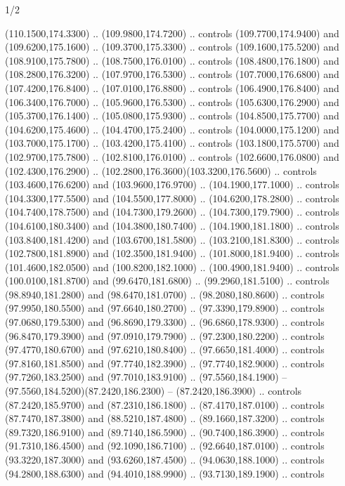 \begin{flagdescription}{1/2}
\begin{scope}[xshift=\flaglength/6]
\begin{scope}[scale=0.00247\flagwidth,yshift=241mm,xshift=-27.1mm]
\begin{scope}[y=0.80pt, x=0.80pt, yscale=-0.9, xscale=1]
\begin{scope}[cm={{-1.0,0.0,0.0,1.0,(-107.89793,0.0)}},shift={(-300.0,0)}]
\begin{scope}[shift={(-53.94897,373.26853)},draw=red]
  (110.1500,174.3300) .. (109.9800,174.7200) .. controls (109.7700,174.9400) and
  (109.6200,175.1600) .. (109.3700,175.3300) .. controls (109.1600,175.5200) and
  (108.9100,175.7800) .. (108.7500,176.0100) .. controls (108.4800,176.1800) and
  (108.2800,176.3200) .. (107.9700,176.5300) .. controls (107.7000,176.6800) and
  (107.4200,176.8400) .. (107.0100,176.8800) .. controls (106.4900,176.8400) and
  (106.3400,176.7000) .. (105.9600,176.5300) .. controls (105.6300,176.2900) and
  (105.3700,176.1400) .. (105.0800,175.9300) .. controls (104.8500,175.7700) and
  (104.6200,175.4600) .. (104.4700,175.2400) .. controls (104.0000,175.1200) and
  (103.7000,175.1700) .. (103.4200,175.4100) .. controls (103.1800,175.5700) and
  (102.9700,175.7800) .. (102.8100,176.0100) .. controls (102.6600,176.0800) and
  (102.4300,176.2900) .. (102.2800,176.3600)(103.3200,176.5600) .. controls
  (103.4600,176.6200) and (103.9600,176.9700) .. (104.1900,177.1000) .. controls
  (104.3300,177.5500) and (104.5500,177.8000) .. (104.6200,178.2800) .. controls
  (104.7400,178.7500) and (104.7300,179.2600) .. (104.7300,179.7900) .. controls
  (104.6100,180.3400) and (104.3800,180.7400) .. (104.1900,181.1800) .. controls
  (103.8400,181.4200) and (103.6700,181.5800) .. (103.2100,181.8300) .. controls
  (102.7800,181.8900) and (102.3500,181.9400) .. (101.8000,181.9400) .. controls
  (101.4600,182.0500) and (100.8200,182.1000) .. (100.4900,181.9400) .. controls
  (100.0100,181.8700) and (99.6470,181.6800) .. (99.2960,181.5100) .. controls
  (98.8940,181.2800) and (98.6470,181.0700) .. (98.2080,180.8600) .. controls
  (97.9950,180.5500) and (97.6640,180.2700) .. (97.3390,179.8900) .. controls
  (97.0680,179.5300) and (96.8690,179.3300) .. (96.6860,178.9300) .. controls
  (96.8470,179.3900) and (97.0910,179.7900) .. (97.2300,180.2200) .. controls
  (97.4770,180.6700) and (97.6210,180.8400) .. (97.6650,181.4000) .. controls
  (97.8160,181.8500) and (97.7740,182.3900) .. (97.7740,182.9000) .. controls
  (97.7260,183.2500) and (97.7010,183.9100) .. (97.5560,184.1900) --
  (97.5560,184.5200)(87.2420,186.2300) -- (87.2420,186.3900) .. controls
  (87.2420,185.9700) and (87.2310,186.1800) .. (87.4170,187.0100) .. controls
  (87.7470,187.3800) and (88.5210,187.4800) .. (89.1660,187.3200) .. controls
  (89.7320,186.9100) and (89.7140,186.5900) .. (90.7400,186.3900) .. controls
  (91.7310,186.4500) and (92.1090,186.7100) .. (92.6640,187.0100) .. controls
  (93.3220,187.3000) and (93.6260,187.4500) .. (94.0630,188.1000) .. controls
  (94.2800,188.6300) and (94.4010,188.9900) .. (93.7130,189.1900) .. controls

\end{scope}
\end{scope}
\end{scope}
\end{scope}
\end{scope}
\end{flagdescription}
